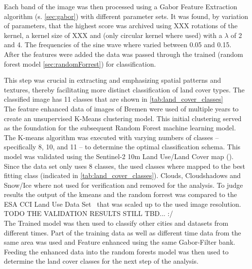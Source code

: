 \documentclass[12pt,a4paper, english]{article}
\begin{document}
    Each band of the image was then processed using a Gabor Feature Extraction algorithm (s. \cref{sec:gabor}) with different parameter sets. 
    It was found, by variation of parameters, that the highest score was archived using XXX 
    rotations of the kernel, a kernel size of XXX
    and (only circular kernel where used) with a $\lambda$ of 2 and 4. %
    The frequencies of the sine wave where varied between 0.05 and 0.15. \\ 
    After the features were added the data was passed through the trained (random forest model \cref{sec:randomForrest}) for classification. 

    This step was crucial in extracting and emphasizing spatial patterns and textures, thereby facilitating more distinct classification of land cover types. %
    The classified image has 11 classes that are shown in \cref{tab:land_cover_classes}
    \\
    The feature enhanced data of images of Bremen%
    were used of multiple years to create an unsupervised K-Means clustering model.%
    This initial clustering served as the foundation for the subsequent Random Forest machine learning model.
    The K-means algorithm was executed with varying numbers of classes – specifically 8, 10, and 11 – to determine the optimal classification schema.
    This model was validated using the Sentinel-2 10m Land Use/Land Cover map (\cite{Zhang}).
    Since the data set only uses 8 classes, the used classes where mapped to the best fitting class (indicated in \cref{tab:land_cover_classes}). 
    Clouds, Cloudshadows and Snow/Ice where not used for verification and removed for the analysis.
    To judge results the output of the kmeans and the random forrest was compared to the ESA CCI Land Use Data Set~\cite{landformclassicationusingfuzzykmeans2000} that was scaled up to the used image resolution. %
    \\
    TODO THE VALIDATION RESULTS STILL TBD... :/ 
    \\ 
    The Trained model was then used to classify other cities and datasets from different times. 
    Part of the training data as well as different time data from the same area was used and Feature enhanced using the same Gabor-Filter bank.
    Feeding the enhanced data into the random forests model was then used to determine the land cover classes for the next step of the analysis.
\end{document}
